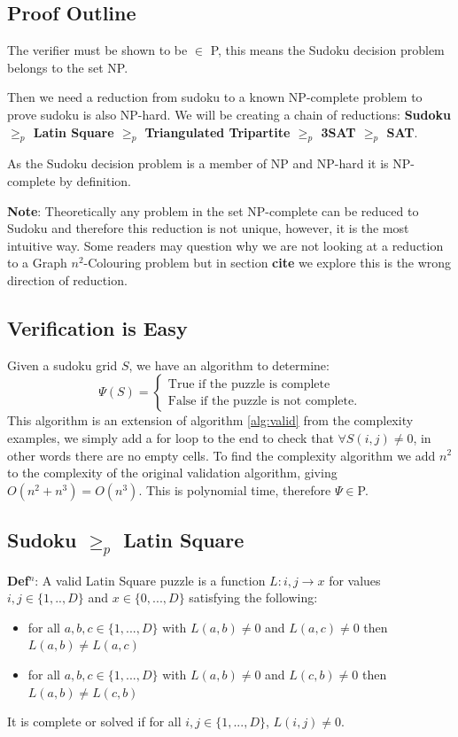 \documentclass[a4paper,11pt]{report}
\newcounter{row}
\begin{document}
\subsection{Proof Outline}

The verifier must be shown to be $\in$ P, this means the Sudoku decision problem belongs to the set NP.

Then we need a reduction from sudoku to a known NP-complete problem to prove sudoku is also NP-hard. We will be creating a chain of reductions: \textbf{Sudoku $\geq_p$ Latin Square $\geq_p$ Triangulated Tripartite $\geq_p$ 3SAT $\geq_p$ SAT}.

As the Sudoku decision problem is a member of NP and NP-hard it is NP-complete by definition.

\textbf{Note}: Theoretically any problem in the set NP-complete can be reduced to Sudoku and therefore this reduction is not unique, however, it is the most intuitive way. Some readers may question why we are not looking at a reduction to a Graph
$n^2$-Colouring problem but in section \textbf{cite} we explore this is the wrong direction of reduction.

\subsection{Verification is Easy}

Given a sudoku grid $S$, we have an algorithm to determine:
		\begin{equation}
			\Psi(S) = \begin{cases}	
				\text{True if the puzzle is complete} \\
				\text{False if the puzzle is not complete}.
			\end{cases}
		\end{equation}
This algorithm is an extension of algorithm \ref{alg:valid} from the complexity examples, we simply add a for loop to the end to check that $\forall S(i,j) \neq 0 $, in other words there are no empty cells. To find the complexity algorithm we add $n^2$ to the complexity of the original validation algorithm, giving $O(n^2+n^3)=O(n^3)$. This is polynomial time, therefore $\Psi\in $P.
\subsection{Sudoku $\geq_p$ Latin Square}

\textbf{Def$^n$}: A valid Latin Square puzzle is a function $L:i,j \rightarrow x$ for values $i,j \in \{1,..,D\} $ and $x \in
\{0,...,D\}$ satisfying the following:
\begin{itemize}
\item{for all $a,b,c \in \{1,...,D\}$ with $L(a,b) \neq 0 $ and $L(a,c) \neq 0$ then $L(a,b) \neq L(a,c)$}
\item{for all $a,b,c \in \{1,...,D\}$ with $L(a,b) \neq 0 $ and $L(c,b) \neq 0$ then $L(a,b) \neq L(c,b)$}
\end{itemize}
It is complete or solved if for all $i,j \in \{1,...,D\}$, $L(i,j) \neq 0$.
\end{document}
